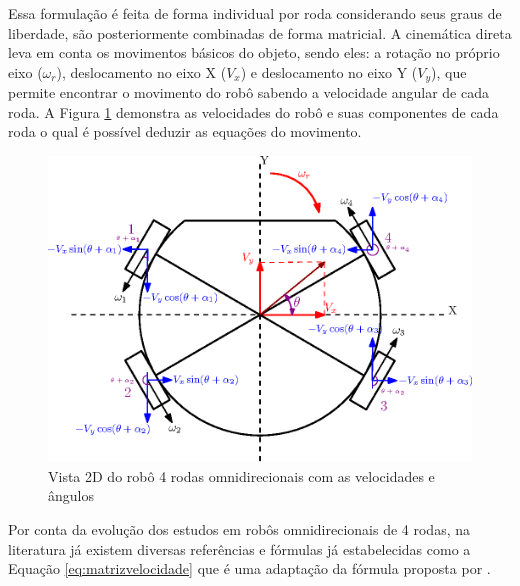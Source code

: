 \documentclass[deposito, acronym, symbols]{fei}
\begin{document}
Essa formulação é feita de forma individual por roda considerando seus graus de liberdade, são posteriormente combinadas de forma matricial. A cinemática direta leva em conta os movimentos básicos do objeto, sendo eles: a rotação no próprio eixo ($\omega_r$), deslocamento no eixo X ($V_x$) e deslocamento no eixo Y ($V_y$), que permite encontrar o movimento do robô sabendo a velocidade angular de cada roda. A Figura \ref{fig:cin_clasica} demonstra as velocidades do robô e suas componentes de cada roda o qual é possível deduzir as equações do movimento.

\begin{figure}[!htb]

 \centering

 \caption{Vista 2D do robô 4 rodas omnidirecionais com as velocidades e ângulos}

 \includegraphics[scale=1]{Imagens/Omni_wheels_clasic.eps}


 \label{fig:cin_clasica}

\end{figure}

Por conta da evolução dos estudos em robôs omnidirecionais de 4 rodas, na literatura já existem diversas referências e fórmulas já estabelecidas como a Equação \ref{eq:matrizvelocidade} que é uma adaptação da fórmula proposta por \textcite{rijalusalam2021implementation}.
\end{document}

